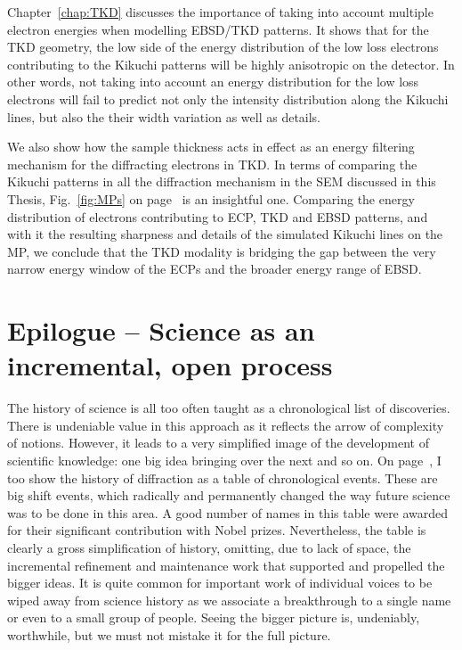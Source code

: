 Chapter~\ref{chap:TKD} discusses the importance of taking into account multiple electron energies when modelling EBSD/TKD patterns. It shows that for the TKD geometry, the low side of the energy distribution of the low loss electrons contributing to the Kikuchi patterns will be highly anisotropic on the detector. In other words, not taking into account an energy distribution for the low loss electrons will fail to predict not only the intensity distribution along the Kikuchi lines, but also the their width variation as well as details.

We also show how the sample thickness acts in effect as an energy filtering mechanism for the diffracting electrons in TKD. In terms of comparing the Kikuchi patterns in all the diffraction mechanism in the SEM discussed in this Thesis, Fig.~\ref{fig:MPs} on page~\pageref{fig:MPs} is an insightful one. Comparing the energy distribution of electrons contributing to ECP, TKD and EBSD patterns, and with it the resulting sharpness and details of the simulated Kikuchi lines on the MP, we conclude that the TKD modality is bridging the gap between the very narrow energy window of the ECPs and the broader energy range of EBSD. 


\section{Epilogue -- Science as an incremental, open process}

The history of science is all too often taught as a chronological list of discoveries. There is undeniable value in this approach as it reflects the arrow of complexity of notions. However, it leads to a very simplified image of the development of scientific knowledge: one big idea bringing over the next and so on. On page~\pageref{table:historyDiff}, I too show the history of diffraction as a table of chronological events. These are big shift events, which radically and permanently changed the way future science was to be done in this area. A good number of names in this table were awarded for their significant contribution with Nobel prizes. Nevertheless, the table is clearly a gross simplification of history, omitting, due to lack of space, the incremental refinement and maintenance work that supported and propelled the bigger ideas. It is quite common for important work of individual voices to be wiped away from science history as we associate a breakthrough to a single name or even to a small group of people. Seeing the bigger picture is, undeniably, worthwhile, but we must not mistake it for the full picture.

